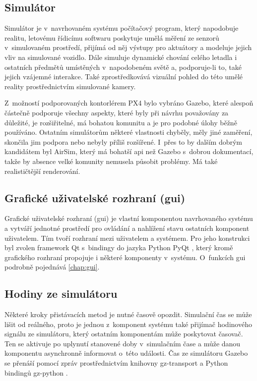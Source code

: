     \subsection{Simulátor}
      Simulátor je v~navrhovaném systému počítačový program, který napodobuje realitu, letovému řídicímu softwaru poskytuje umělá měření ze senzorů v~simulovaném prostředí, přijímá od něj výstupy pro aktuátory a modeluje jejich vliv na simulované vozidlo. Dále simuluje dynamické chování celého letadla i ostatních předmětů umístěných v~napodobeném světě a, podporuje-li to, také jejich vzájemné interakce. Také zprostředkovává vizuální pohled do této umělé reality prostřednictvím simulované kamery.

      Z~možností podporovaných kontorlérem PX4 bylo vybráno Gazebo, které alespoň částečně podporuje všechny aspekty, které byly při návrhu považovány za důležité, je rozšiřitelné, má bohatou komunitu a je pro podobné úlohy běžně používáno. Ostatním simulátorům některé vlastnosti chyběly, měly jiné zaměření, skončila jim podpora nebo nebyly příliš rozšířené. I~přes to by dalším dobrým kandidátem byl AirSim, který má bohatší \acrshort{api} než Gazebo s~dobrou dokumentací, takže by absence velké komunity nemusela působit problémy. Má také realističtější renderování.
    \subsection{Grafické uživatelské rozhraní (\acrshort{gui})}
      Grafické uživatelské rozhraní (\acrshort{gui}) je vlastní komponentou navrhovaného systému a vytváří jednotné prostředí pro ovládání a nahlížení stavu ostatních komponent uživatelem. Tím tvoří rozhraní mezi uživatelem a systémem. Pro jeho konstrukci byl zvolen framework Qt s~bindingy do jazyka Python PyQt \cite{pyqt}, který kromě grafického rozhraní propojuje i některé komponenty v~systému. O~funkcích \acrshort{gui} podrobně pojednává \cref{chap:gui}. 
    \subsection{Hodiny ze simulátoru}
      Některé kroky přistávacích metod je nutné časově opozdit. Simulační čas se může lišit od reálného, proto je jednou z~komponent systému také přijímač hodinového signálu ze simulátoru, který ostatním komponentám může poskytovat časovač. Ten se aktivuje po uplynutí stanovené doby v~simulačním čase a může danou komponentu asynchronně informovat o~této události. Čas ze simulátoru Gazebo se přenáší pomocí zpráv prostřednictvím knihovny gz-transport a Python bindingů gz-python \cite{gz-python}. 
